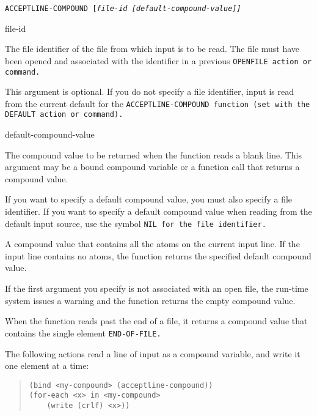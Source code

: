 \Format

\tt{ACCEPTLINE-COMPOUND} [\it{file-id} [\it{default-compound-value}]]

\begin{arguments}
\item[file-id]

  The file identifier of the file from which input is to be read. The
  file must have been opened and associated with the identifier in a
  previous \tt{OPENFILE} action or command.

  This argument is optional. If you do not specify a file identifier,
  input is read from the current default for the
  \tt{ACCEPTLINE-COMPOUND} function (set with the \tt{DEFAULT} action
  or command).

\item[default-compound-value]

  The compound value to be returned when the function reads a blank
  line. This argument may be a bound compound variable or a function
  call that returns a compound value.

  If you want to specify a default compound value, you must also
  specify a file identifier. If you want to specify a default compound
  value when reading from the default input source, use the symbol
  \tt{NIL} for the file identifier.
\end{arguments}

\ReturnValue

A compound value that contains all the atoms on the current input
line. If the input line contains no atoms, the function returns the
specified default compound value.

If the first argument you specify is not associated with an open file,
the run-time system issues a warning and the function returns the
empty compound value.

When the function reads past the end of a file, it returns a compound
value that contains the single element \tt{END-OF-FILE}.

\Example

The following actions read a line of input as a compound variable, and
write it one element at a time:

\begin{quote}
\begin{verbatim}
(bind <my-compound> (acceptline-compound))
(for-each <x> in <my-compound>
    (write (crlf) <x>))
\end{verbatim}
\end{quote}
  
